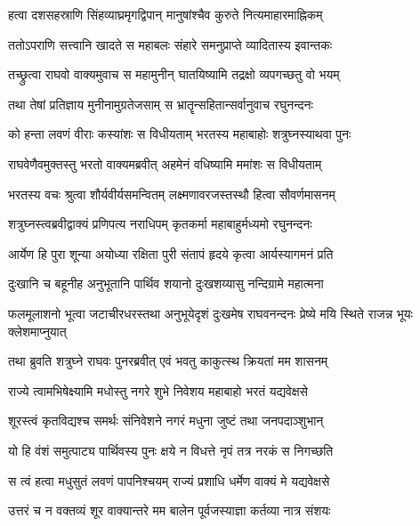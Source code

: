\twolineshloka
{हत्वा दशसहस्राणि सिंहव्याघ्रमृगद्विपान्}
{मानुषांश्चैव कुरुते नित्यमाहारमाह्निकम्} %

\twolineshloka
{ततोऽपराणि सत्त्वानि खादते स महाबलः}
{संहारे समनुप्राप्ते व्यादितास्य इवान्तकः} %

\twolineshloka
{तच्छ्रुत्वा राघवो वाक्यमुवाच स महामुनीन्}
{घातयिष्यामि तद्रक्षो व्यपगच्छतु वो भयम्} %

\twolineshloka
{तथा तेषां प्रतिज्ञाय मुनीनामुग्रतेजसाम्}
{स भ्रातॄन्सहितान्सर्वानुवाच रघुनन्दनः} %

\twolineshloka
{को हन्ता लवणं वीराः कस्यांशः स विधीयताम्}
{भरतस्य महाबाहोः शत्रुघ्नस्याथवा पुनः} %

\twolineshloka
{राघवेणैवमुक्तस्तु भरतो वाक्यमब्रवीत्}
{अहमेनं वधिष्यामि ममांशः स विधीयताम्} %

\twolineshloka
{भरतस्य वचः श्रुत्वा शौर्यवीर्यसमन्वितम्}
{लक्ष्मणावरजस्तस्थौ हित्वा सौवर्णमासनम्} %

\twolineshloka
{शत्रुघ्नस्त्वब्रवीद्वाक्यं प्रणिपत्य नराधिपम्}
{कृतकर्मा महाबाहुर्मध्यमो रघुनन्दनः} %

\twolineshloka
{आर्येण हि पुरा शून्या अयोध्या रक्षिता पुरी}
{संतापं हृदये कृत्वा आर्यस्यागमनं प्रति} %

\twolineshloka
{दुःखानि च बहूनीह अनुभूतानि पार्थिव}
{शयानो दुःखशय्यासु नन्दिग्रामे महात्मना} %

\threelineshloka
{फलमूलाशनो भूत्वा जटाचीरधरस्तथा}
{अनुभूयेदृशं दुःखमेष राघवनन्दनः}
{प्रेष्ये मयि स्थिते राजन्न भूयः क्लेशमाप्नुयात्} %

\twolineshloka
{तथा ब्रुवति शत्रुघ्ने राघवः पुनरब्रवीत्}
{एवं भवतु काकुत्स्थ क्रियतां मम शासनम्} %

\twolineshloka
{राज्ये त्वामभिषेक्ष्यामि मधोस्तु नगरे शुभे}
{निवेशय महाबाहो भरतं यद्यवेक्षसे} %

\twolineshloka
{शूरस्त्वं कृतविद्यश्च समर्थः संनिवेशने}
{नगरं मधुना जुष्टं तथा जनपदाञ्शुभान्} %

\twolineshloka
{यो हि वंशं समुत्पाट्य पार्थिवस्य पुनः क्षये}
{न विधत्ते नृपं तत्र नरकं स निगच्छति} %

\twolineshloka
{स त्वं हत्वा मधुसुतं लवणं पापनिश्चयम्}
{राज्यं प्रशाधि धर्मेण वाक्यं मे यद्यवेक्षसे} %

\twolineshloka
{उत्तरं च न वक्तव्यं शूर वाक्यान्तरे मम}
{बालेन पूर्वजस्याज्ञा कर्तव्या नात्र संशयः} %

